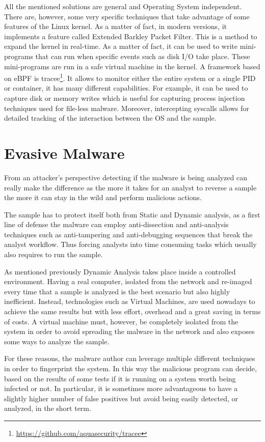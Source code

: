 \bigskip
All the mentioned solutions are general and Operating System independent. There are, however, some very specific techniques that take advantage of some features of the Linux kernel. As a matter of fact, in modern versions, it implements a feature called Extended Barkley Packet Filter. This is a method to expand the kernel in real-time. As a matter of fact, it can be used to write mini-programs that can run when specific events such as disk I/O take place. These mini-programs are run in a safe virtual machine in the kernel. A framework based on eBPF is tracee\footnote{\url{https://github.com/aquasecurity/tracee}}. It allows to monitor either the entire system or a single PID or container, it has many different capabilities. For example, it can be used to capture disk or memory writes which is useful for capturing process injection techniques used for file-less malware. Moreover, intercepting syscalls allows for detailed tracking of the interaction between the OS and the sample. 

 
\section{Evasive Malware}
\label{sec:evmal}

From an attacker's perspective detecting if the malware is being analyzed can really make the difference as the more it takes for an analyst to reverse a sample the more it can stay in the wild and perform malicious actions. 

The sample has to protect itself both from Static and Dynamic analysis, as a first line of defense the malware can employ anti-dissection and anti-analysis techniques such as anti-tampering and anti-debugging sequences that break the analyst workflow. Thus forcing analysts into time consuming tasks which usually also requires to run the sample. 

As mentioned previously Dynamic Analysis takes place inside a controlled environment. Having a real computer, isolated from the network and re-imaged every time that a sample is analyzed is the best scenario but also highly inefficient. Instead, technologies such as Virtual Machines, are used nowadays to achieve the same results but with less effort, overhead and a great saving in terms of costs. A virtual machine must, however, be completely isolated from the system in order to avoid spreading the malware in the network and also exposes some ways to analyze the sample. 

For these reasons, the malware author can leverage multiple different techniques in order to fingerprint the system. In this way the malicious program can decide, based on the results of some tests if it is running on a system worth being infected or not. In particular, it is sometimes more advantageous to have a slightly higher number of false positives but avoid being easily detected, or analyzed, in the short term. 

